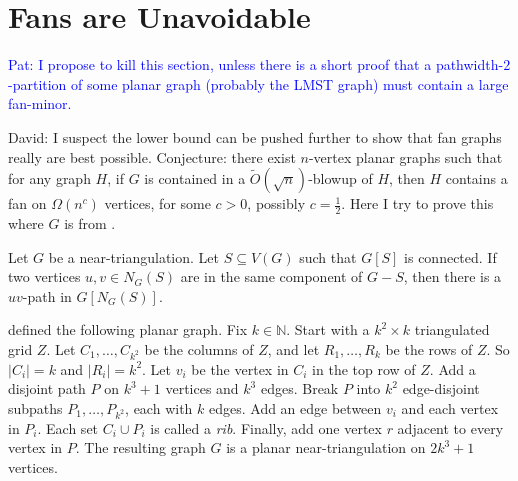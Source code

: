 \documentclass{patmorin}
\newcommand{\david}[1]{{\color{orange} David: #1}}
\newcommand{\pat}[1]{\textcolor{Blue}{Pat: #1}}
\newcommand{\defin}[1]{\emph{\textcolor{brightmaroon}{#1}}}
\begin{document}

\section{Fans are Unavoidable}

\pat{I propose to kill this section, unless there is a short proof that a pathwidth-$2$-partition of some planar graph (probably the LMST graph) must contain a large fan-minor.}

\david{I suspect the lower bound can be pushed further to show  that fan graphs really are best possible. Conjecture: there exist $n$-vertex planar graphs such that for any graph $H$, if $G$ is contained in  a $\tilde{O}(\sqrt{n})$-blowup of $H$, then $H$ contains a fan on $\Omega(n^c)$ vertices, for some $c>0$, possibly $c=\frac12$. Here I try to prove this where $G$ is from \citep{LMST08}. }

\begin{lem}
\label{FindPath}
Let $G$ be a near-triangulation. Let $S\subseteq V(G)$ such that $G[S]$ is connected. If two vertices $u,v\in N_G(S)$ are in the same component of $G-S$, then there is a $uv$-path in $G[ N_G(S) ]$.
\end{lem}

\citet{LMST08} defined the following planar graph. Fix $k\in\mathbb{N}$. Start with a $k^2 \times k$ triangulated grid $Z$. Let $C_1,\dots,C_{k^2}$ be the columns of $Z$, and let $R_1,\dots,R_k$ be the rows of $Z$. So $|C_i|=k$ and $|R_i|=k^2$. Let $v_i$ be the vertex in $C_i$ in the top row of $Z$. Add a disjoint path $P$ on $k^3+1$ vertices and $k^3$ edges. Break $P$ into $k^2$ edge-disjoint subpaths $P_1,\dots,P_{k^2}$, each with $k$ edges. Add an edge between $v_i$ and each vertex in $P_i$.
Each set $C_i\cup P_i$ is called a \defin{rib}. Finally, add one vertex $r$ adjacent to every vertex in $P$. The resulting graph $G$ is a planar near-triangulation on $2k^3+1$ vertices.
\end{document}
